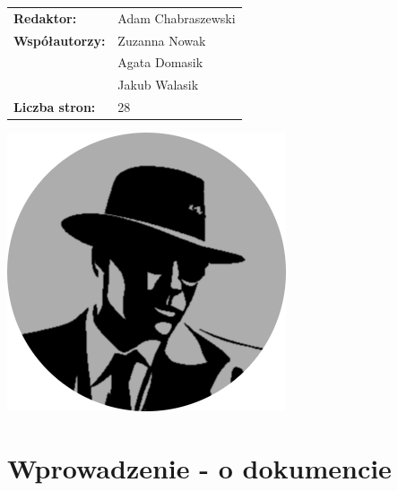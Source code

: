 \documentclass[12pt,a4paper,colorlinks=true,linkcolor=NavyBlue,citecolor=red,urlcolor=NavyBlue]{book}
\begin{document}
\begin{titlepage}
\normalsize
\bigskip
\fontsize{12}{12}\selectfont
\vspace{1.5mm}
\raggedright
\begin{tabular}{ll}
\textbf{Redaktor:} & Adam Chabraszewski \\[6mm]
\textbf{Współautorzy:}
& Zuzanna Nowak \\[2mm]
& Agata Domasik \\[2mm]
& Jakub Walasik \\[6mm]
\textbf{Liczba stron:} & 28 \\[2mm]
\end{tabular}

\vspace{\fill}
\begin{center}
    \includegraphics[scale=0.3]{logo.png} 
\end{center}
\vspace{-15mm}
\end{titlepage}



\tableofcontents

\chapter{Wprowadzenie - o dokumencie}
\end{document}
